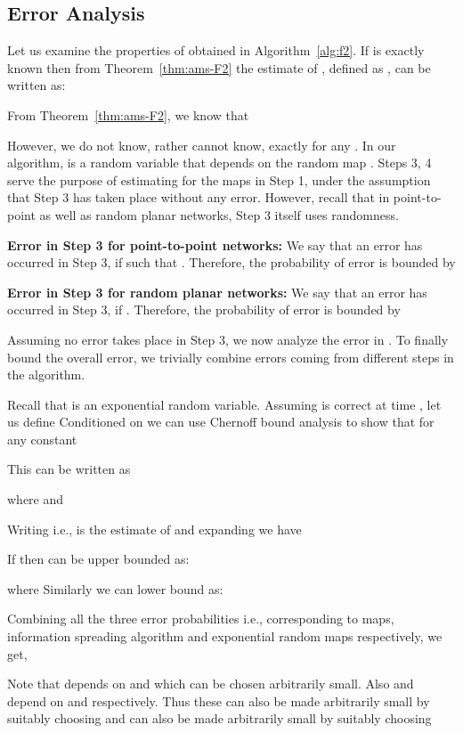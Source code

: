 \documentclass[10pt,twosided,a4paper,draft,onecolumn]{article}
\begin{document}
\subsection{Error Analysis}
\label{sec:err-analysis}

Let us examine the properties of  obtained in
Algorithm~\ref{alg:f2}. If  is exactly known then
from Theorem~\ref{thm:ams-F2} the estimate of , defined as
, can be written as:

From Theorem~\ref{thm:ams-F2}, we know that 



However, we do not know, rather cannot know,  exactly for any
. In our algorithm,  is a random variable that depends on
the random map . Steps 3, 4 serve the purpose of estimating
 for the maps in Step 1, under the assumption that Step 3 has
taken place without any error.  However, recall that in point-to-point
as well as random planar networks, Step 3 itself uses randomness.

\textbf{Error in Step 3 for point-to-point networks:} We say that an
error has occurred in Step 3, if  such
that . Therefore, the probability of error is
bounded by 

\textbf{Error in Step 3 for random planar networks:} We say that an
error has occurred in Step 3, if . Therefore, the
probability of error is bounded by 

Assuming no error takes place in Step 3, we now analyze the error in
. To finally bound the overall error, we trivially
combine errors coming from different steps in the algorithm.

Recall that  is an exponential random variable.
 Assuming  is correct at time , let us
define 
Conditioned on  we can use Chernoff bound analysis to show
that for any constant 

This can be written as

where  and 


Writing  i.e.,  is the estimate of
 and expanding  we have



If 
then  can be upper bounded as:

where  Similarly
we can lower bound  as:

Combining all the three error probabilities i.e.,  
 corresponding to  maps, information spreading algorithm
and exponential random maps respectively, we get, 

Note that  depends on  and  which
can be chosen arbitrarily small. Also  and  depend on
 and  respectively. Thus these
can also be made arbitrarily small by suitably choosing  and
  can also be made arbitrarily small by suitably choosing
 
\end{document}
